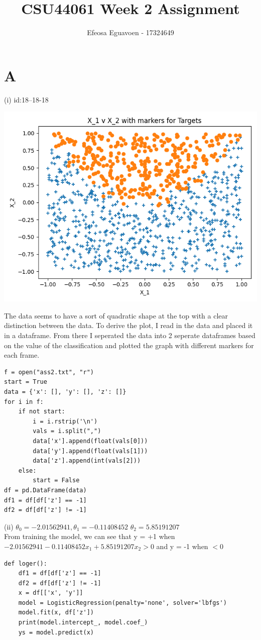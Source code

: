 \documentclass[10pt,a4paper]{article}
\author{Efeosa Eguavoen - 17324649}
\title{CSU44061 Week 2 Assignment}
\begin{document}
\maketitle
\section{A}
(i)
id:18--18-18
\begin{center}
\includegraphics[scale=0.3]{x1vx2.jpg}
\end{center}
The data seems to have a sort of quadratic shape at the top with a clear distinction between the data. To derive the plot, I read in the data and placed it in a dataframe. From there I seperated the data into 2 seperate dataframes based on the value of the classification and plotted the graph with different markers for each frame. 
\begin{verbatim}
f = open("ass2.txt", "r")
start = True
data = {'x': [], 'y': [], 'z': []}
for i in f:
    if not start:
        i = i.rstrip('\n')
        vals = i.split(",")
        data['x'].append(float(vals[0]))
        data['y'].append(float(vals[1]))
        data['z'].append(int(vals[2]))
    else:
        start = False
df = pd.DataFrame(data)
df1 = df[df['z'] == -1]
df2 = df[df['z'] != -1]
\end{verbatim}
(ii)
 \(\theta_0 = -2.01562941, \theta_1 =  -0.11408452 \) \(\theta_2 =  5.85191207\)
\\
From training the model, we can see that y = +1 when \(-2.01562941 -0.11408452x_1 + 5.85191207x_2 > 0\) and y = -1 when \(< 0\)
\\
\begin{verbatim}
def loger():
    df1 = df[df['z'] == -1]
    df2 = df[df['z'] != -1]
    x = df[['x', 'y']]
    model = LogisticRegression(penalty='none', solver='lbfgs')
    model.fit(x, df['z'])
    print(model.intercept_, model.coef_)
    ys = model.predict(x)
\end{verbatim}
\end{document}
